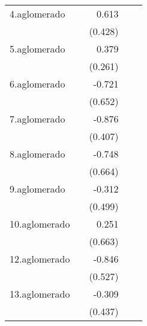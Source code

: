 {\begin{longtable}{l*{4}{D{.}{.}{-1}}}
\addlinespace
4.aglomerado&                     &       0.613         &                     &                     \\
            &                     &     (0.428)         &                     &                     \\
\addlinespace
5.aglomerado&                     &       0.379         &                     &                     \\
            &                     &     (0.261)         &                     &                     \\
\addlinespace
6.aglomerado&                     &      -0.721         &                     &                     \\
            &                     &     (0.652)         &                     &                     \\
\addlinespace
7.aglomerado&                     &      -0.876\sym{*}  &                     &                     \\
            &                     &     (0.407)         &                     &                     \\
\addlinespace
8.aglomerado&                     &      -0.748         &                     &                     \\
            &                     &     (0.664)         &                     &                     \\
\addlinespace
9.aglomerado&                     &      -0.312         &                     &                     \\
            &                     &     (0.499)         &                     &                     \\
\addlinespace
10.aglomerado&                     &       0.251         &                     &                     \\
            &                     &     (0.663)         &                     &                     \\
\addlinespace
12.aglomerado&                     &      -0.846         &                     &                     \\
            &                     &     (0.527)         &                     &                     \\
\addlinespace
13.aglomerado&                     &      -0.309         &                     &                     \\
            &                     &     (0.437)         &                     &                     \\

\end{longtable}}
